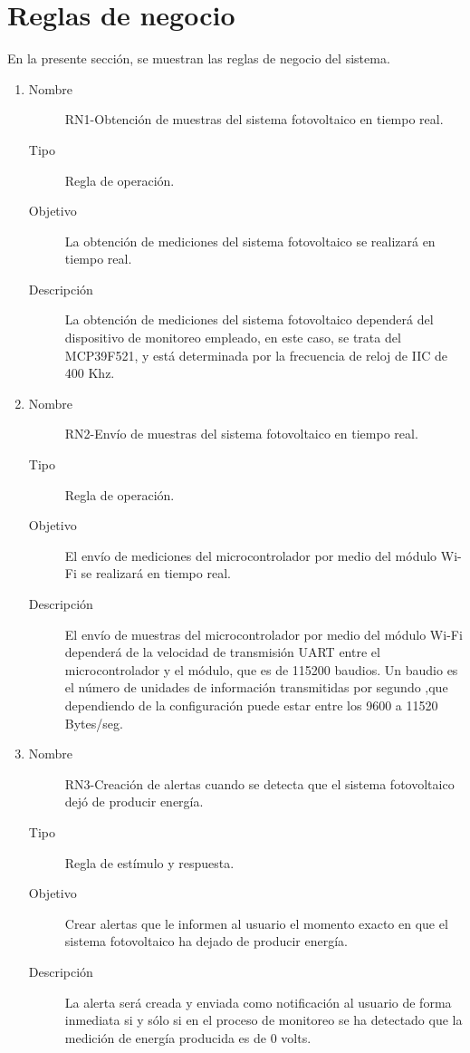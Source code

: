 \section{Reglas de negocio}
En la presente sección, se muestran las reglas de negocio del sistema.
\begin{enumerate}[label=RN\arabic*.]
    \item \label{RN1}
		\begin{description}
			\item[Nombre] RN1-Obtención de muestras del sistema fotovoltaico en tiempo real.
			\item[Tipo] Regla de operación.
			\item[Objetivo] La obtención de mediciones del sistema fotovoltaico se realizará en tiempo real.
			\item[Descripción] La obtención de mediciones del sistema fotovoltaico dependerá del dispositivo de monitoreo empleado, en este caso, se trata del MCP39F521, y está determinada por la frecuencia de reloj de IIC de 400 Khz.
    		\end{description}
    		
\item \label{RN2}
	\begin{description}
		\item[Nombre] RN2-Envío de muestras del sistema fotovoltaico en tiempo real.
		\item[Tipo] Regla de operación.
		\item[Objetivo] El envío de mediciones del microcontrolador por medio del módulo Wi-Fi se realizará en tiempo real.
		\item[Descripción] El envío de muestras del microcontrolador por medio del módulo Wi-Fi dependerá de la velocidad de transmisión UART entre el microcontrolador y el módulo, que es de 115200 baudios. Un baudio es el número de unidades de información transmitidas por segundo ,que dependiendo de la configuración puede estar entre los 9600 a 11520 Bytes/seg.
		\end{description}	
		
    \item \label{RN3}
		\begin{description}
			\item[Nombre] RN3-Creación de alertas cuando se detecta que el sistema fotovoltaico dejó de producir energía.
			\item[Tipo] Regla de estímulo y respuesta.
			\item[Objetivo] Crear alertas que le informen al usuario el momento exacto en que el sistema fotovoltaico ha dejado de producir energía.
			\item[Descripción] La alerta será creada y enviada como notificación al usuario de forma inmediata si y sólo si en el proceso de monitoreo se ha detectado que la medición de energía producida es de 0 volts.  
    		\end{description}
    		

\end{enumerate}
